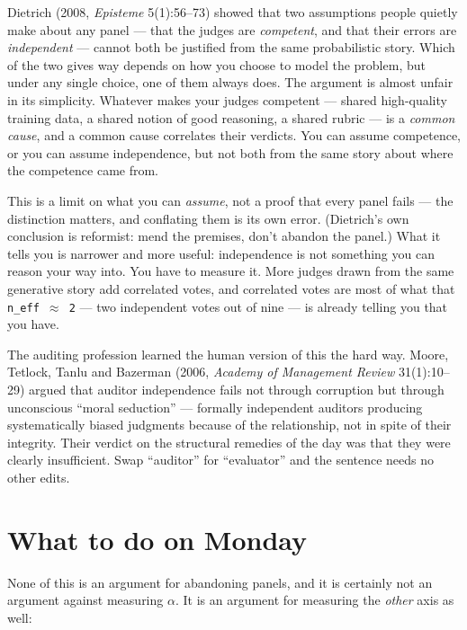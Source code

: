 \documentclass[11pt,a4paper]{article}
\newcommand{\code}[1]{\texttt{#1}}
\begin{document}
Dietrich (2008, \emph{Episteme} 5(1):56--73) showed that two assumptions people quietly make about
any panel --- that the judges are \emph{competent}, and that their errors are \emph{independent} ---
cannot both be justified from the same probabilistic story. Which of the two gives way depends on
how you choose to model the problem, but under any single choice, one of them always does. The
argument is almost unfair in its simplicity. Whatever makes your judges competent --- shared
high-quality training data, a shared notion of good reasoning, a shared rubric --- is a \emph{common
cause}, and a common cause correlates their verdicts. You can assume competence, or you can assume
independence, but not both from the same story about where the competence came from.

This is a limit on what you can \emph{assume}, not a proof that every panel fails --- the
distinction matters, and conflating them is its own error. (Dietrich's own conclusion is reformist:
mend the premises, don't abandon the panel.) What it tells you is narrower and more useful:
independence is not something you can reason your way into. You have to measure it. More judges
drawn from the same generative story add correlated votes, and correlated votes are most of what
that \code{n\_eff $\approx$ 2} --- two independent votes out of nine --- is already telling you
that you have.

The auditing profession learned the human version of this the hard way. Moore, Tetlock, Tanlu and
Bazerman (2006, \emph{Academy of Management Review} 31(1):10--29) argued that auditor independence
fails not through corruption but through unconscious ``moral seduction'' --- formally independent
auditors producing systematically biased judgments because of the relationship, not in spite of
their integrity. Their verdict on the structural remedies of the day was that they were clearly
insufficient. Swap ``auditor'' for ``evaluator'' and the sentence needs no other edits.

\section{What to do on Monday}

None of this is an argument for abandoning panels, and it is certainly not an argument against
measuring $\alpha$. It is an argument for measuring the \emph{other} axis as well:
\end{document}
